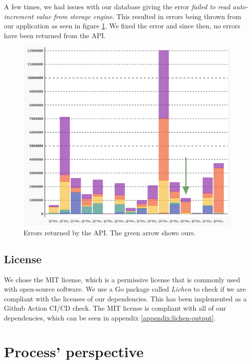 \documentclass{article}
\begin{document}
A few times, we had issues with our database giving the error \textit{failed to read auto-increment value from storage engine}. This resulted in errors being thrown from our application as seen in figure \ref{fig:error-chart}. We fixed the error and since then, no errors have been returned from the API.

\begin{figure}[H]
   \centering
   \includegraphics[width=\textwidth/2]{error-chart.png}
   \caption{Errors returned by the API. The green arrow shows ours.}
   \label{fig:error-chart}
\end{figure}



\subsection{License}
We chose the MIT license, which is a permissive license that is commonly used with open-source software. We use a Go package called \textit{Lichen} to check if we are compliant with the licenses of our dependencies. This has been implemented as a Github Action CI/CD check. The MIT license is compliant with all of our dependencies, which can be seen in appendix \ref{appendix:lichen-output}.



\section{Process' perspective}
\end{document}
